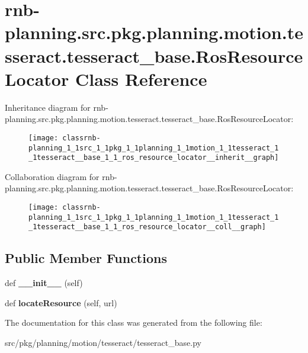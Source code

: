 \hypertarget{classrnb-planning_1_1src_1_1pkg_1_1planning_1_1motion_1_1tesseract_1_1tesseract__base_1_1_ros_resource_locator}{}\section{rnb-\/planning.src.\+pkg.\+planning.\+motion.\+tesseract.\+tesseract\+\_\+base.\+Ros\+Resource\+Locator Class Reference}
\label{classrnb-planning_1_1src_1_1pkg_1_1planning_1_1motion_1_1tesseract_1_1tesseract__base_1_1_ros_resource_locator}


Inheritance diagram for rnb-\/planning.src.\+pkg.\+planning.\+motion.\+tesseract.\+tesseract\+\_\+base.\+Ros\+Resource\+Locator\+:
\nopagebreak
\begin{figure}[H]
\begin{center}
\leavevmode
\texttt{[image: classrnb-planning\_1\_1src\_1\_1pkg\_1\_1planning\_1\_1motion\_1\_1tesseract\_1\_1tesseract\_\_base\_1\_1\_ros\_resource\_locator\_\_inherit\_\_graph]}
\end{center}
\end{figure}


Collaboration diagram for rnb-\/planning.src.\+pkg.\+planning.\+motion.\+tesseract.\+tesseract\+\_\+base.\+Ros\+Resource\+Locator\+:
\nopagebreak
\begin{figure}[H]
\begin{center}
\leavevmode
\texttt{[image: classrnb-planning\_1\_1src\_1\_1pkg\_1\_1planning\_1\_1motion\_1\_1tesseract\_1\_1tesseract\_\_base\_1\_1\_ros\_resource\_locator\_\_coll\_\_graph]}
\end{center}
\end{figure}
\subsection*{Public Member Functions}
\begin{DoxyCompactItemize}
\item 
\mbox{\label{classrnb-planning_1_1src_1_1pkg_1_1planning_1_1motion_1_1tesseract_1_1tesseract__base_1_1_ros_resource_locator_a0cdf328eb7ecb6649d9ee033d437f7f5}} 
def {\bfseries \+\_\+\+\_\+init\+\_\+\+\_\+} (self)
\item 
\mbox{\label{classrnb-planning_1_1src_1_1pkg_1_1planning_1_1motion_1_1tesseract_1_1tesseract__base_1_1_ros_resource_locator_a5645f7bd3b4aa5d4751e2ec1aee94e82}} 
def {\bfseries locate\+Resource} (self, url)
\end{DoxyCompactItemize}


The documentation for this class was generated from the following file\+:\begin{DoxyCompactItemize}
\item 
src/pkg/planning/motion/tesseract/tesseract\+\_\+base.\+py\end{DoxyCompactItemize}
